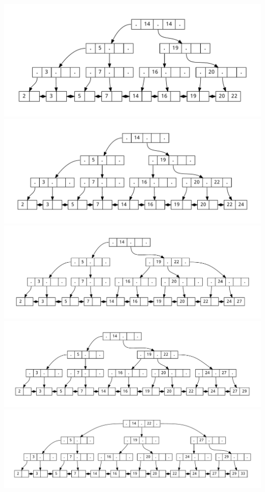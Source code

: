 \documentclass{uni_tue_template}
\begin{document}
  \includegraphics[scale=0.4]{./dot/A1_1-09.pdf}\\
  \includegraphics[scale=0.4]{./dot/A1_1-10.pdf}\\
  \includegraphics[scale=0.4]{./dot/A1_1-11.pdf}\\
  \includegraphics[scale=0.4]{./dot/A1_1-12.pdf}\\
  \includegraphics[scale=0.4]{./dot/A1_1-13.pdf}\\
\end{document}
